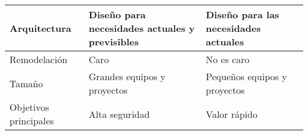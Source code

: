 \begin{longtable}{|p{5cm}|p{5cm}|p{5cm}|}
    Arquitectura                                   & Diseño para necesidades actuales y previsibles                                                                                     & Diseño para las necesidades actuales                                                                                                                                                                \\\hline
    Remodelación                                   & Caro                                                                                                                               & No es caro                                                                                                                                                                                          \\\hline
    Tamaño                                         & Grandes equipos y proyectos                                                                                                        & Pequeños equipos y proyectos                                                                                                                                                                        \\
    Objetivos principales                          & Alta seguridad                                                                                                                     & Valor rápido                                                                                                                                                                                        \\
\end{longtable}